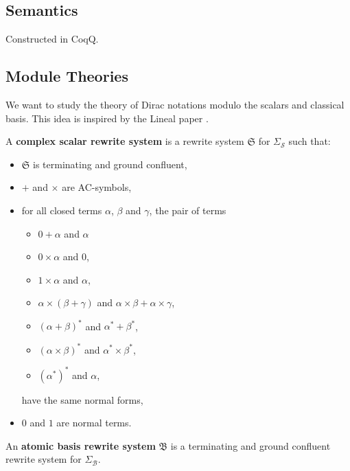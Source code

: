 

\subsection{Semantics}
Constructed in CoqQ.

\subsection{Module Theories}

We want to study the theory of Dirac notations modulo the scalars and classical basis. This idea is inspired by the Lineal paper \cite{Arrighi2017}.

\begin{definition}
  A \textbf{complex scalar rewrite system} is a rewrite system $\mathfrak{S}$ for $\Sigma_\mathcal{S}$ such that:
  \begin{itemize}
    \item $\mathfrak{S}$ is terminating and ground confluent,
    \item $+$ and $\times$ are AC-symbols,
    \item for all closed terms $\alpha$, $\beta$ and $\gamma$, the pair of terms
      \begin{itemize}
        \item $0 + \alpha$ and $\alpha$
        \item $0 \times \alpha$ and $0$,
        \item $1 \times \alpha$ and $\alpha$,
        \item $\alpha \times (\beta + \gamma)$ and $\alpha \times \beta + \alpha \times \gamma$,
        \item $(\alpha + \beta)^*$ and $\alpha^* + \beta^*$,
        \item $(\alpha \times \beta)^*$ and $\alpha^* \times \beta^*$,
        \item $(\alpha^*)^*$ and $\alpha$,
      \end{itemize}
      have the same normal forms,
    \item $0$ and $1$ are normal terms.
  \end{itemize}
\end{definition}


\begin{definition}
  An \textbf{atomic basis rewrite system} $\mathfrak{B}$ is a terminating and ground confluent rewrite system for $\Sigma_\mathcal{B}$.
\end{definition}


